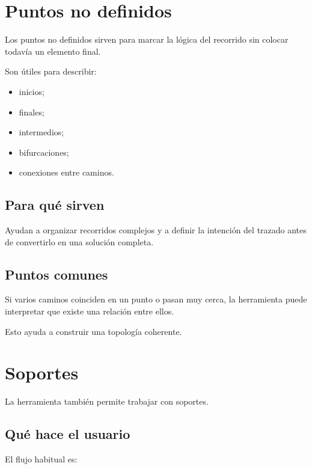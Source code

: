 \section{Puntos no definidos}

Los puntos no definidos sirven para marcar la lógica del recorrido sin colocar todavía un elemento final.

Son útiles para describir:

\begin{itemize}
\item inicios;
\item finales;
\item intermedios;
\item bifurcaciones;
\item conexiones entre caminos.
\end{itemize}

\subsection{Para qué sirven}

Ayudan a organizar recorridos complejos y a definir la intención del trazado antes de convertirlo en una solución completa.

\subsection{Puntos comunes}

Si varios caminos coinciden en un punto o pasan muy cerca, la herramienta puede interpretar que existe una relación entre ellos.

Esto ayuda a construir una topología coherente.



\section{Soportes}

La herramienta también permite trabajar con soportes.

\subsection{Qué hace el usuario}

El flujo habitual es:

